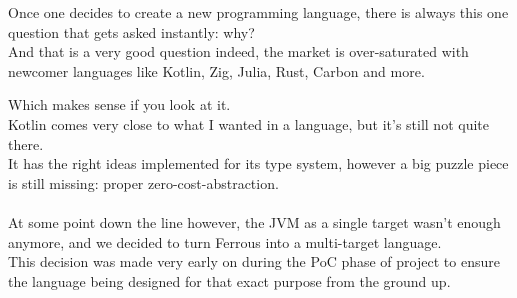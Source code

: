 
Once one decides to create a new programming language, there is always
this one question that gets asked instantly: why?\\
And that is a very good question indeed, the market is over-saturated
with newcomer languages like Kotlin, Zig, Julia, Rust, Carbon and more.\\


\noindent
Which makes sense if you look at it.\\
Kotlin comes very close to what I wanted in a language, but it's still not
quite there.\\
It has the right ideas implemented for its type system, however a big puzzle
piece is still missing: proper zero-cost-abstraction.\\
\\
At some point down the line however, the JVM as a single target wasn't enough
anymore, and we decided to turn Ferrous into a multi-target language.\\
This decision was made very early on during the PoC phase of project to ensure the
language being designed for that exact purpose from the ground up.\\
\\

